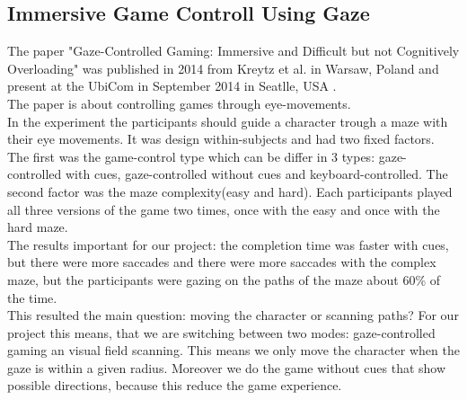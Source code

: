 \documentclass{sigchi}
\begin{document}
\subsection{Immersive Game Controll Using Gaze}
The paper "Gaze-Controlled Gaming: Immersive and Difficult but not Cognitively Overloading" was published in 2014 from Kreytz et al. in Warsaw, Poland and present at the UbiCom in September 2014 in Seatlle, USA \cite{krejtz2014gaze}.\\
The paper is about controlling games through eye-movements.\\
In the experiment the participants should guide a character trough a maze with their eye movements. It was design within-subjects and had two fixed factors. The first was the game-control type which can be differ in 3 types: gaze-controlled with cues, gaze-controlled without cues and keyboard-controlled. The second factor was the maze complexity(easy and hard). Each participants played all three versions of the game two times, once with the easy and once with the hard maze.\\
The results important for our project: the completion time was faster with cues, but there were more saccades and there were more saccades with the complex maze, but the participants were gazing on the paths of the maze about 60\% of the time.\\
This resulted the main question: moving the character or scanning paths? For our project this means, that we are switching between two modes: gaze-controlled gaming an visual field scanning. This means we only move the character when the gaze is within a given radius. Moreover we do the game without cues that show possible directions, because this reduce the game experience. 
\end{document}
